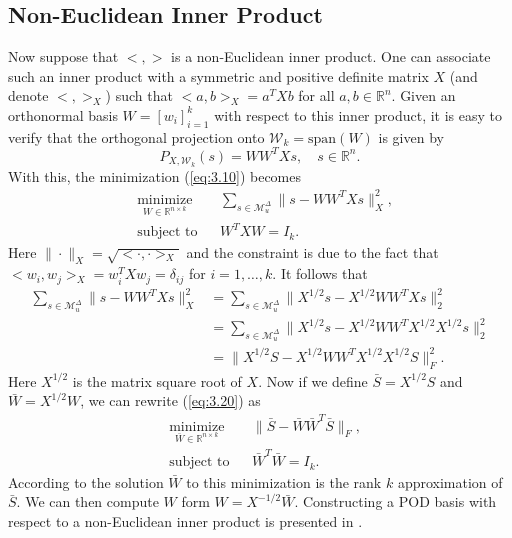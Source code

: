\subsection{Non-Euclidean Inner Product} \label{sec:3.2.2}
Now suppose that $<,>$ is a non-Euclidean inner product. One can associate such an inner product with a symmetric and positive definite matrix $X$ (and denote $<,>_X$) such that $<a,b>_X = a^TXb$ for all $a,b\in \mathbb R^n$. Given an orthonormal basis $W = [w_i]_{i=1}^k$ with respect to this inner product, it is easy to verify that the orthogonal projection onto $\mathcal W_k = \text{span}(W)$ is given by
\begin{equation} \label{eq:3.19}
	P_{X,\mathcal W_k}(s) = WW^TXs, \quad s\in \mathbb R^{n}.
\end{equation}
With this, the minimization (\ref{eq:3.10}) becomes
\begin{equation} \label{eq:3.20}
\begin{aligned}
&  \underset{W\in\mathbb R^{n\times k}}{\text{minimize}}
& & \sum_{s\in \mathcal M_u^{\Delta}} \| s - WW^TXs\|^2_X, \\
& \text{subject to}
& & W^TXW=I_k.
\end{aligned}
\end{equation}
Here $\| \cdot \|_X = \sqrt{<\cdot , \cdot>_X}$ and the constraint is due to the fact that $<w_i,w_j>_X = w_i^TXw_j = \delta_{ij}$ for $i=1,\dots,k$. It follows that
\begin{equation} \label{eq:3.21}
\begin{aligned}
	\sum_{s\in \mathcal M_u^{\Delta}} \| s - WW^TXs\|^2_X &= \sum_{s\in \mathcal M_u^{\Delta}} \| X^{1/2}s - X^{1/2}WW^TXs\|_2^2 \\
	&= \sum_{s\in \mathcal M_u^{\Delta}} \| X^{1/2}s - X^{1/2}WW^TX^{1/2} X^{1/2}s\|_2^2 \\
	& = \| X^{1/2}S - X^{1/2}WW^TX^{1/2} X^{1/2}S \|_F^2.
\end{aligned}
\end{equation}
Here $X^{1/2}$ is the matrix square root of $X$. Now if we define $\bar S = X^{1/2} S$ and $\bar W = X^{1/2} W$, we can rewrite (\ref{eq:3.20}) as 
\begin{equation} \label{eq:3.22}
\begin{aligned}
&  \underset{\bar W\in\mathbb R^{n\times k}}{\text{minimize}}
& & \| \bar S - \bar W \bar W^T \bar S\|_F, \\
& \text{subject to}
& & \bar W^T\bar W=I_k.
\end{aligned}
\end{equation}
According to  the solution $\bar W$ to this minimization is the rank $k$ approximation of $\bar S$. We can then compute $W$ form $W = X^{-1/2}\bar W$. Constructing a POD basis with respect to a non-Euclidean inner product is presented in .

